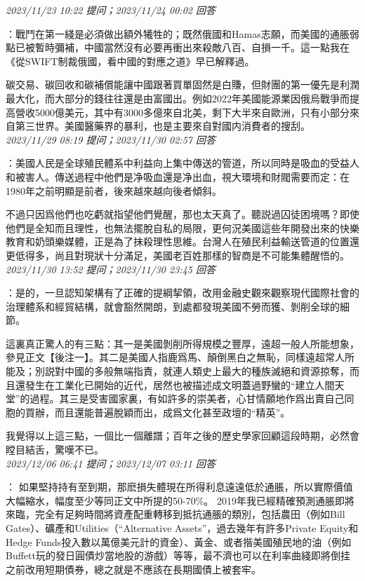 \documentclass[twocolumn]{ctexart}
\begin{document}
\textit{\hfill\noindent\small 2023/11/23 10:22 提问；2023/11/24 00:02 回答}

：戰鬥在第一綫是必須做出額外犧牲的；既然俄國和Hamas志願，而美國的通脹弱點已被暫時彌補，中國當然沒有必要再衝出來殺敵八百、自損一千。這一點我在《從SWIFT制裁俄國，看中國的對應之道》早已解釋過。

碳交易、碳回收和碳補償能讓中國跟著買單固然是白賺，但財團的第一優先是利潤最大化，而大部分的錢往往還是由富國出。例如2022年美國能源業因俄烏戰爭而提高營收5000億美元，其中有3000多億來自北美，剩下大半來自歐洲，只有小部分來自第三世界。美國醫藥界的暴利，也是主要來自對國内消費者的搜刮。
\\

\textit{\hfill\noindent\small 2023/11/29 08:19 提问；2023/11/30 02:57 回答}

：美國人民是全球殖民體系中利益向上集中傳送的管道，所以同時是吸血的受益人和被害人。傳送過程中他們是净吸血還是净出血，視大環境和財閥需要而定：在1980年之前明顯是前者，後來越來越向後者傾斜。

不過只因爲他們也吃虧就指望他們覺醒，那也太天真了。聽説過囚徒困境嗎？即使他們是全知而且理性，也無法擺脫自私的局限，更何況美國這些年開發出來的快樂教育和奶頭樂媒體，正是為了抹殺理性思維。台灣人在殖民利益輸送管道的位置還更低得多，尚且對現狀十分滿足，美國老百姓那樣的智商是不可能集體醒悟的。
\\

\textit{\hfill\noindent\small 2023/11/30 13:52 提问；2023/11/30 23:45 回答}

：是的，一旦認知架構有了正確的提綱挈領，改用金融史觀來觀察現代國際社會的治理體系和經貿結構，就會豁然開朗，到處都發現美國不勞而獲、剝削全球的細節。

這裏真正驚人的有三點：其一是美國剝削所得規模之豐厚，遠超一般人所能想象，參見正文【後注一】。其二是美國人指鹿爲馬、顛倒黑白之無恥，同樣遠超常人所能及；別説對中國的多般無端指責，就連人類史上最大的種族滅絕和資源掠奪，而且還發生在工業化已開始的近代，居然也被描述成文明蓋過野蠻的“建立人間天堂”的過程。其三是受害國家裏，有如許多的崇美者，心甘情願地作爲出賣自己同胞的買辦，而且還能普遍脫穎而出，成爲文化甚至政壇的“精英”。

我覺得以上這三點，一個比一個離譜；百年之後的歷史學家回顧這段時期，必然會瞠目結舌，驚嘆不已。
\\

\textit{\hfill\noindent\small 2023/12/06 06:41 提问；2023/12/07 03:11 回答}

：
如果堅持持有至到期，那麽損失體現在所得利息遠遠低於通脹，所以實際價值大幅縮水，幅度至少等同正文中所提的50-70\%。
2019年我已經精確預測通脹即將來臨，完全有足夠時間將資產配重轉移到抵抗通脹的類別，包括農田（例如Bill Gates）、礦產和Utilities（“Alternative Assets”，過去幾年有許多Private Equity和Hedge Funds投入數以萬億美元計的資金）、黃金、或者揩美國殖民地的油（例如Buffett玩的發日圓債炒當地股的游戲）等等，最不濟也可以在利率曲綫即將倒挂之前改用短期債券，總之就是不應該在長期國債上被套牢。
\\
\end{document}

